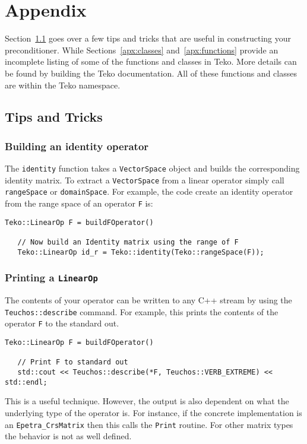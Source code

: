 \documentclass[12pt]{article}
\newcommand{\code}[1]{\lstinline[basicstyle=\footnotesize]!#1!}
\begin{document}
\appendix
\section{Appendix}
Section~\ref{apx:tips-tricks} goes over a few tips and tricks that are useful
in constructing your preconditioner. While Sections~\ref{apx:classes} and~\ref{apx:functions}
provide an incomplete listing of some of the functions and classes in Teko. More details can
be found by building the Teko documentation. All of these functions and classes are
within the Teko namespace.

\subsection{Tips and Tricks}\label{apx:tips-tricks}
\subsubsection{Building an identity operator}
The \code{identity} function takes a \code{VectorSpace} object and builds the corresponding
identity matrix. To extract a \code{VectorSpace} from a linear operator simply call \code{rangeSpace}
or \code{domainSpace}. For example, the code create an identity operator from the range space of an operator 
\code{F} is:
\begin{framed}
\begin{lstlisting}[numbers=none]
   Teko::LinearOp F = buildFOperator()

   // Now build an Identity matrix using the range of F
   Teko::LinearOp id_r = Teko::identity(Teko::rangeSpace(F));
\end{lstlisting}
\end{framed}

\subsubsection{Printing a \code{LinearOp}}
The contents of your operator can be written to any C++ stream by using
the \code{Teuchos::describe} command. For example, this prints the contents
of the operator \code{F} to the standard out.
\begin{framed}
\begin{lstlisting}[numbers=none]
   Teko::LinearOp F = buildFOperator()

   // Print F to standard out
   std::cout << Teuchos::describe(*F, Teuchos::VERB_EXTREME) << std::endl;
\end{lstlisting}
\end{framed}
This is a useful technique. However, the output is also dependent on what the underlying
type of the operator is. For instance, if the concrete implementation is an \code{Epetra_CrsMatrix}
then this calls the \code{Print} routine. For other matrix types the behavior is not
as well defined.
\end{document}
